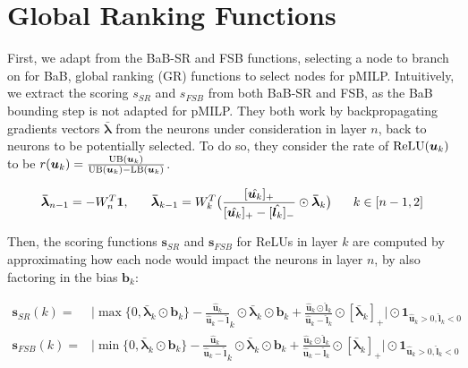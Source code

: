 \section{Global Ranking Functions}

\label{sec4p5}

First, we adapt from the BaB-SR \cite{BaB} and FSB \cite{FSB} functions, selecting a node to branch on for BaB, global ranking (GR) functions to select nodes for pMILP. Intuitively, we extract the scoring $s_{SR}$ and $s_{FSB}$ from both BaB-SR and FSB, as the BaB bounding step is not adapted for pMILP. They both work by backpropagating gradients vectors $\bm{\bar{\lambda}}$ from the neurons under consideration in layer $n$, back to neurons to be potentially selected. To do so, they consider the rate of $\mathrm{ReLU}(\bm{u}_k)$ to be $r(\bm{u}_k)=\frac{\mathrm{UB}(\bm{u}_k)}{\mathrm{UB}(\bm{u}_k)-\mathrm{LB}(\bm{u}_k)}$.

\begin{align*}
\bm{\bar{\lambda}}_{n-1} = -W^T_n\bm{1}, \hspace*{4ex}  	\bm{\bar{\lambda}}_{k-1} = W^T_k\big(\dfrac{[\hat{\bm{u}_k}]_+}{[\hat{\bm{u}_k}]_+-[\hat{\bm{l}_k}]_-}\odot\bm{\bar{\lambda}}_{k}\big) \hspace*{4ex}  k\in [n-1,2]
\end{align*}


Then, the scoring functions $\bm{s}_{SR}$ and $\bm{s}_{FSB}$ for ReLUs in layer $k$ are computed by approximating how each node would impact the neurons in layer $n$, by also factoring in the bias $\bm{b}_k$:

\begin{align*}
	\bm{s}_{SR}(k) =& \lvert\max\{0,\bm{\bar{\lambda}}_{k}\odot\bm{b}_{k}\}-\frac{\hat{\bm{u}}_k}{\hat{\bm{u}}_k-\hat{\bm{l}}}_k\odot\bm{\bar{\lambda}}_{k}\odot\bm{{b}}_{k}+\frac{\hat{\bm{u}}_k\odot\hat{\bm{l}}_k}{\hat{\bm{u}}_k-\hat{\bm{l}}_k}\odot[\bm{\bar{\lambda}}_{k}]_+\rvert \odot\bm{1}_{\hat{\bm{u}}_k>0,\hat{\bm{l}}_k<0} \\
	\bm{s}_{FSB}(k) =& \lvert\min\{0,\bm{\bar{\lambda}}_{k}\odot\bm{b}_{k}\}-\frac{\hat{\bm{u}}_k}{\hat{\bm{u}}_k-\hat{\bm{l}}}_k\odot\bm{\bar{\lambda}}_{k}\odot\bm{{b}}_{k}+\frac{\hat{\bm{u}}_k\odot\hat{\bm{l}}_k}{\hat{\bm{u}}_k-\hat{\bm{l}}_k}\odot[\bm{\bar{\lambda}}_{k}]_+\rvert \odot\bm{1}_{\hat{\bm{u}}_k>0,\hat{\bm{l}}_k<0}
\end{align*}



